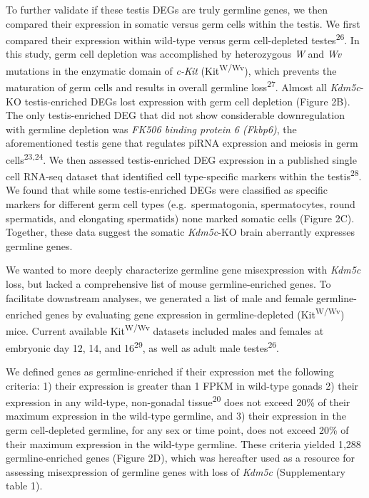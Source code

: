 \documentclass[
]{article}
\begin{document}
To further validate if these testis DEGs are truly germline genes, we
then compared their expression in somatic versus germ cells within the
testis. We first compared their expression within wild-type versus germ
cell-depleted testes\textsuperscript{26}. In this study, germ cell
depletion was accomplished by heterozygous \emph{W} and \emph{Wv}
mutations in the enzymatic domain of \emph{c-Kit}
(Kit\textsuperscript{W/Wv}), which prevents the maturation of germ cells
and results in overall germline loss\textsuperscript{27}. Almost all
\emph{Kdm5c}-KO testis-enriched DEGs lost expression with germ cell
depletion (Figure 2B). The only testis-enriched DEG that did not show
considerable downregulation with germline depletion was \emph{FK506
binding protein 6 (Fkbp6)}, the aforementioned testis gene that
regulates piRNA expression and meiosis in germ
cells\textsuperscript{23,24}. We then assessed testis-enriched DEG
expression in a published single cell RNA-seq dataset that identified
cell type-specific markers within the testis\textsuperscript{28}. We
found that while some testis-enriched DEGs were classified as specific
markers for different germ cell types (e.g.~spermatogonia,
spermatocytes, round spermatids, and elongating spermatids) none marked
somatic cells (Figure 2C). Together, these data suggest the somatic
\emph{Kdm5c}-KO brain aberrantly expresses germline genes.

We wanted to more deeply characterize germline gene misexpression with
\emph{Kdm5c} loss, but lacked a comprehensive list of mouse
germline-enriched genes. To facilitate downstream analyses, we generated
a list of male and female germline-enriched genes by evaluating gene
expression in germline-depleted (Kit\textsuperscript{W/Wv}) mice.
Current available Kit\textsuperscript{W/Wv} datasets included males and
females at embryonic day 12, 14, and 16\textsuperscript{29}, as well as
adult male testes\textsuperscript{26}.

We defined genes as germline-enriched if their expression met the
following criteria: 1) their expression is greater than 1 FPKM in
wild-type gonads 2) their expression in any wild-type, non-gonadal
tissue\textsuperscript{20} does not exceed 20\% of their maximum
expression in the wild-type germline, and 3) their expression in the
germ cell-depleted germline, for any sex or time point, does not exceed
20\% of their maximum expression in the wild-type germline. These
criteria yielded 1,288 germline-enriched genes (Figure 2D), which was
hereafter used as a resource for assessing misexpression of germline
genes with loss of \emph{Kdm5c} (Supplementary table 1).
\end{document}
